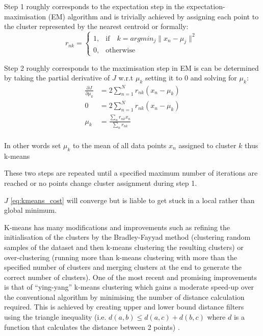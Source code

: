 Step 1 roughly corresponds to the expectation step in the expectation-maximisation (EM) algorithm and is trivially achieved by 
assigning each point to the cluster represented by the nearest centroid or formally:
\[
    r_{nk} = 
    \begin{cases}
        1,& \text{if} \quad k=argmin_{j} \|x_{n} - \mu_{j}\|^{2}\\
        0,& \text{otherwise}
    \end{cases}
\]

Step 2 roughly corresponds to the maximisation step in EM is can be determined by taking the partial derivative of \(J\) w.r.t 
\(\mu_{k}\) setting it to 0 and solving for \(\mu_{k}\):
\begin{equation}
    \begin{aligned}
        \frac{\partial J}{\partial \mu_{k}} &= 2 \sum_{n=1}^{N} r_{nk} (x_{n} - \mu_{k}) \\
        0 &= 2 \sum_{n=1}^{N} r_{nk} (x_{n} - \mu_{k})\\
        \mu_{k} &= \frac{\sum_{n} r_{nk}x_{n}}{\sum_{n} r_{nk}}\\
    \end{aligned}
\end{equation}


In other words set \(\mu_{k}\) to the mean of all data points \(x_{n}\) assigned to cluster \(k\) thus k-means \citep{Bishop2006}

These two steps are repeated until a specified maximum number of iterations are reached or no points change cluster assignment during
step 1.

\(J\) \ref{eq:kmeans_cost} will converge but is liable to get stuck in a local rather than global minimum.

K-means has many modifications and improvements such as refining the initialisation of the clusters by 
the Bradley-Fayyad method (clustering random samples of the dataset and then k-means clustering the resulting clusters) \citep{Bradley1998} 
or over-clustering (running more than k-means clustering with more than the specified number of clusters and merging clusters at the end
to generate the correct number of clusters). One of the most recent and promising improvements is that of ``ying-yang'' k-means
clustering which gains a moderate speed-up over the conventional algorithm by minimising the number of distance calculation required.
This is achieved by creating upper and lower bound distance filters using the triangle inequality (i.e. \(d(a,b) \leq d(a,c) + d(b,c)\) where 
\(d\) is a function that calculates the distance between 2 points) \citep{Ding2015}.



